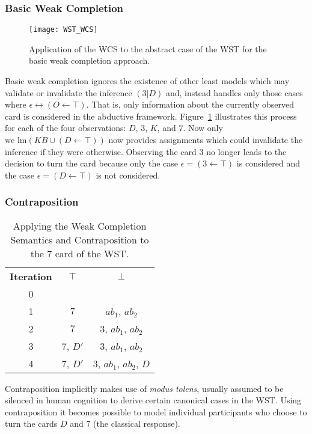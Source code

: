 \subsubsection*{Basic Weak Completion}
\begin{figure}
\centering \texttt{[image: WST\_WCS]}
\caption{Application of the WCS to the abstract case of the WST for the basic weak completion approach.}
\label{wst_wcs}
\end{figure}
Basic weak completion ignores the existence of other least models which may validate or invalidate the inference $(3|D)$ and, instead handles only those cases where $\epsilon \leftrightarrow (O\leftarrow \top)$. That is, only information about the currently observed card is considered in the abductive framework. Figure~\ref{wst_wcs} illustrates this process for each of the four observations: $D$, $3$, $K$, and $7$. Now only $\textrm{wc lm}(KB \cup (D \leftarrow \top))$ now provides assignments which could invalidate the inference if they were otherwise. Observing the card $3$ no longer leads to the decision to turn the card because only the case $\epsilon = (3\leftarrow \top)$ is considered and the case $\epsilon = (D \leftarrow \top)$ is not considered.

\subsubsection*{Contraposition}
\begin{table}
\begin{center}
\begin{tabular}{ c c c }
 \textbf{Iteration} & \textbf{$\top$} & \textbf{$\bot$} \\ 
 0 &  &  \\  
 1 &  $7$ & $ab_1$, $ab_2$  \\  
 2 &  $7$ & $3$, $ab_1$, $ab_2$  \\
 3 &  $7$, $D'$ & $3$, $ab_1$, $ab_2$  \\
 4 &  $7$, $D'$ & $3$, $ab_1$, $ab_2$, $D$  
\end{tabular}
\caption{Applying the Weak Completion Semantics and Contraposition to the $7$ card of the WST.}
\label{tbl:7cont}
\end{center}
\end{table}

Contraposition implicitly makes use of \textit{modus tolens}, usually assumed to be silenced in human cognition to derive certain canonical cases in the WST. Using contraposition it becomes possible to model individual participants who choose to turn the cards $D$ and $7$ (the classical response).

